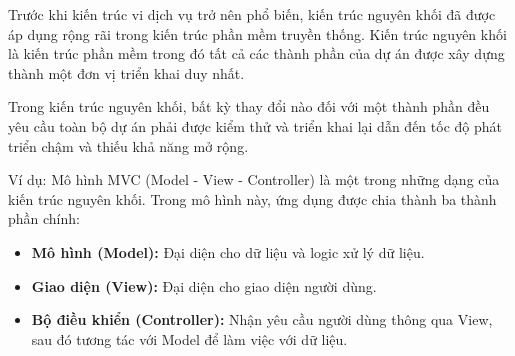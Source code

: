 Trước khi kiến trúc vi dịch vụ trở nên phổ biến, kiến trúc nguyên khối đã được áp dụng rộng rãi trong kiến trúc phần mềm truyền thống. Kiến trúc nguyên khối là kiến trúc phần mềm trong đó tất cả các thành phần của dự án được xây dựng thành một đơn vị triển khai duy nhất.

Trong kiến trúc nguyên khối, bất kỳ thay đổi nào đối với một thành phần đều yêu cầu toàn bộ dự án phải được kiểm thử và triển khai lại dẫn đến tốc độ phát triển chậm và thiếu khả năng mở rộng.

Ví dụ: Mô hình MVC (Model - View - Controller) là một trong những dạng của kiến trúc nguyên khối. Trong mô hình này, ứng dụng được chia thành ba thành phần chính:

\begin{itemize}

\item \textbf{Mô hình (Model):} Đại diện cho dữ liệu và logic xử lý dữ liệu.

\item \textbf{Giao diện (View):} Đại diện cho giao diện người dùng.

\item \textbf{Bộ điều khiển (Controller):} Nhận yêu cầu người dùng thông qua View, sau đó tương tác với Model để làm việc với dữ liệu.

\end{itemize}